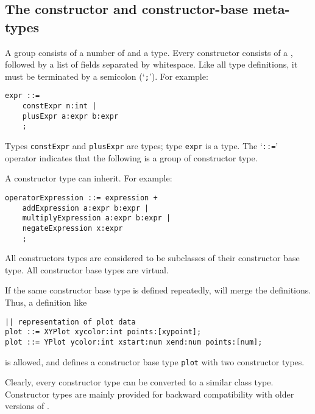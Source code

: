 \subsection{The constructor and constructor-base meta-types}
A  group consists of a number of 
and a  type.
Every constructor consists of a , followed by a 
list of fields separated by whitespace.
Like all type definitions, it must be terminated by a semicolon (`\verb';'').
For example:
\begin{showfile}
\begin{verbatim}
expr ::=
    constExpr n:int |
    plusExpr a:expr b:expr
    ;
\end{verbatim}
\end{showfile}
Types \texttt{constExpr} and \texttt{plusExpr} are  types;
type \texttt{expr} is a  type.
The `\verb'::='' operator indicates that the following is a group of
constructor type.
\par
A constructor type can inherit. For example:
\begin{showfile}
\begin{verbatim}
operatorExpression ::= expression +
    addExpression a:expr b:expr |
    multiplyExpression a:expr b:expr |
    negateExpression x:expr
    ;
\end{verbatim}
\end{showfile}
All constructors types are considered to be subclasses of their
constructor base type. All constructor base types are virtual.
\par
If the same constructor base type is defined repeatedly, {\Tm} will merge the
definitions.
Thus, a definition like
\begin{showfile}
\begin{verbatim}
|| representation of plot data
plot ::= XYPlot xycolor:int points:[xypoint];
plot ::= YPlot ycolor:int xstart:num xend:num points:[num];
\end{verbatim}
\end{showfile}
is allowed, and defines a constructor base type \texttt{plot} with two
constructor types.
\par
Clearly, every constructor type can be converted to a similar class type.
Constructor types are mainly provided for backward compatibility with
older versions of {\Tm}.
